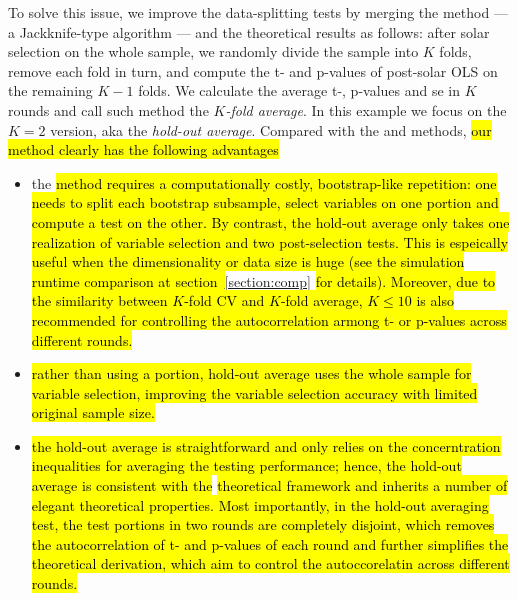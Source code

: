 \documentclass[12pt]{article}
\begin{document}
To solve this issue, we improve the data-splitting tests by merging the \citet{bousquet2002stability} method --- a Jackknife-type algorithm ---  and the \citet{diciccio2020exact} theoretical results as follows: after solar selection on the whole sample, we randomly divide the sample into $K$ folds, remove each fold in turn, and compute the t- and p-values of post-solar OLS on the remaining $K-1$ folds. We calculate the average t-, p-values and se in $K$ rounds and call such method the \emph{$K$-fold average}. In this example we focus on the $K=2$ version, aka the \emph{hold-out average}. Compared with the \citet{wasserman2009high} and \citet{meinshausen2009p} methods, \hl{our method clearly has the following advantages}

\begin{itemize}
  \item the \citet{meinshausen2009p} \hl{method requires a computationally costly, bootstrap-like repetition: one needs to split each bootstrap subsample, select variables on one portion and compute a test on the other. By contrast, the hold-out average only takes one realization of variable selection and two post-selection tests. This is espeically useful when the dimensionality or data size is huge (see the simulation runtime comparison at section~}\ref{section:comp} \hl{for details). Moreover, due to the similarity between $K$-fold CV and $K$-fold average, $K \leqslant 10$ is also recommended for controlling the autocorrelation armong t- or p-values across different rounds.}
  \item \hl{rather than using a portion, hold-out average uses the whole sample for variable selection, improving the variable selection accuracy with limited original sample size.}
  \item \hl{the hold-out average is straightforward and only relies on the concerntration inequalities for averaging the testing performance; hence, the hold-out average is consistent with the} \citet{diciccio2020exact} \hl{theoretical framework and inherits a number of elegant theoretical properties. Most importantly, in the hold-out averaging test, the test portions in two rounds are completely disjoint, which removes the autocorrelation of t- and p-values of each round and further simplifies the} \citet{diciccio2020exact} \hl{theoretical derivation, which aim to control the autoccorelatin across different rounds.}
\end{itemize}
\end{document}
